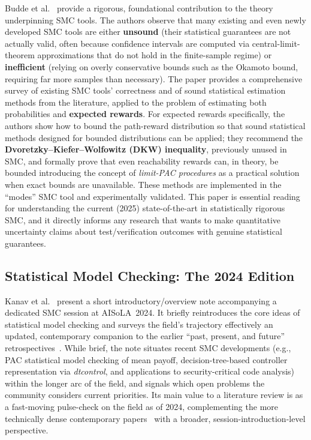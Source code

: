 Budde et al.~\cite{budde2025sound} provide a rigorous, foundational
contribution to the theory underpinning SMC tools.  The authors observe
that many existing and even newly developed SMC tools are either
\textbf{unsound} (their statistical guarantees are not actually valid,
often because confidence intervals are computed via central-limit-theorem
approximations that do not hold in the finite-sample regime) or
\textbf{inefficient} (relying on overly conservative bounds such as the
Okamoto bound, requiring far more samples than necessary).  The paper
provides a comprehensive survey of existing SMC tools' correctness and
of sound statistical estimation methods from the literature, applied to
the problem of estimating both probabilities and \textbf{expected
rewards}.  For expected rewards specifically, the authors show how to
bound the path-reward distribution so that sound statistical methods
designed for bounded distributions can be applied; they recommend the
\textbf{Dvoretzky--Kiefer--Wolfowitz (DKW) inequality}, previously
unused in SMC, and formally prove that even reachability rewards can, in
theory, be bounded introducing the concept of \emph{limit-PAC
procedures} as a practical solution when exact bounds are unavailable.
These methods are implemented in the ``modes'' SMC tool and
experimentally validated.  This paper is essential reading for
understanding the current (2025) state-of-the-art in statistically
rigorous SMC, and it directly informs any research that wants to make
quantitative uncertainty claims about test/verification outcomes with
genuine statistical guarantees.

\subsection{Statistical Model Checking: The 2024 Edition}
\label{sec:lr_kanav}

Kanav et al.~\cite{kanav2025smc2024} present a short
introductory/overview note accompanying a dedicated SMC session at
AISoLA~2024.  It briefly reintroduces the core ideas of statistical
model checking and surveys the field's trajectory effectively an
updated, contemporary companion to the earlier ``past, present, and
future'' retrospectives~\cite{larsen2014smc}.  While brief, the note
situates recent SMC developments (e.g., PAC statistical model checking
of mean payoff, decision-tree-based controller representation via
\emph{dtcontrol}, and applications to security-critical code analysis)
within the longer arc of the field, and signals which open problems the
community considers current priorities.  Its main value to a literature
review is as a fast-moving pulse-check on the field as of 2024,
complementing the more technically dense contemporary
papers~\cite{budde2025sound, soltani2023spare} with a broader,
session-introduction-level perspective.

